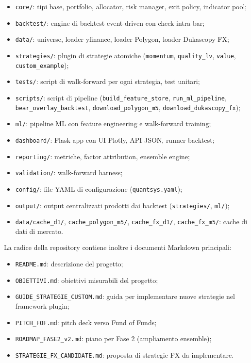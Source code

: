 \begin{itemize}
  \item \texttt{core/}: tipi base, portfolio, allocator, risk manager, exit policy, indicator pool;
  \item \texttt{backtest/}: engine di backtest event-driven con check intra-bar;
  \item \texttt{data/}: universe, loader yfinance, loader Polygon, loader Dukascopy FX;
  \item \texttt{strategies/}: plugin di strategie atomiche (\texttt{momentum}, \texttt{quality\_lv}, \texttt{value}, \texttt{custom\_example});
  \item \texttt{tests/}: script di walk-forward per ogni strategia, test unitari;
  \item \texttt{scripts/}: script di pipeline (\texttt{build\_feature\_store}, \texttt{run\_ml\_pipeline}, \texttt{bear\_overlay\_backtest}, \texttt{download\_polygon\_m5}, \texttt{download\_dukascopy\_fx});
  \item \texttt{ml/}: pipeline ML con feature engineering e walk-forward training;
  \item \texttt{dashboard/}: Flask app con UI Plotly, API JSON, runner backtest;
  \item \texttt{reporting/}: metriche, factor attribution, ensemble engine;
  \item \texttt{validation/}: walk-forward harness;
  \item \texttt{config/}: file YAML di configurazione (\texttt{quantsys.yaml});
  \item \texttt{output/}: output centralizzati prodotti dai backtest (\texttt{strategies/}, \texttt{ml/});
  \item \texttt{data/cache\_d1/}, \texttt{cache\_polygon\_m5/}, \texttt{cache\_fx\_d1/}, \texttt{cache\_fx\_m5/}: cache di dati di mercato.
\end{itemize}

La radice della repository contiene inoltre i documenti Markdown principali:

\begin{itemize}
  \item \texttt{README.md}: descrizione del progetto;
  \item \texttt{OBIETTIVI.md}: obiettivi misurabili del progetto;
  \item \texttt{GUIDE\_STRATEGIE\_CUSTOM.md}: guida per implementare nuove strategie nel framework plugin;
  \item \texttt{PITCH\_FOF.md}: pitch deck verso Fund of Funds;
  \item \texttt{ROADMAP\_FASE2\_v2.md}: piano per Fase 2 (ampliamento ensemble);
  \item \texttt{STRATEGIE\_FX\_CANDIDATE.md}: proposta di strategie FX da implementare.
\end{itemize}

